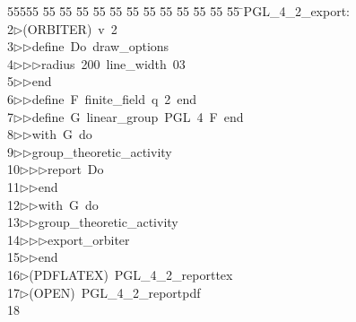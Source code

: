 %
%
\begin{tabbing}
55555 \= 55 \= 55 \= 55 \= 55 \= 55 \= 55 \= 55 \= 55 \= 55 \= 55 \= 55 \= 55 \= \>PGL\_4\_2\_export:\\[0pt]
2\>$\triangleright$\>(ORBITER)\ v\ 2\ \\[0pt]
3\>$\triangleright$\>$\triangleright$\>define\ Do\ draw\_options\ \\[0pt]
4\>$\triangleright$\>$\triangleright$\>$\triangleright$\>radius\ 200\ line\_width\ 03\ \\[0pt]
5\>$\triangleright$\>$\triangleright$\>end\ \\[0pt]
6\>$\triangleright$\>$\triangleright$\>define\ F\ finite\_field\ q\ 2\ end\ \\[0pt]
7\>$\triangleright$\>$\triangleright$\>define\ G\ linear\_group\ PGL\ 4\ F\ end\ \\[0pt]
8\>$\triangleright$\>$\triangleright$\>with\ G\ do\ \\[0pt]
9\>$\triangleright$\>$\triangleright$\>group\_theoretic\_activity\ \\[0pt]
10\>$\triangleright$\>$\triangleright$\>$\triangleright$\>report\ Do\ \\[0pt]
11\>$\triangleright$\>$\triangleright$\>end\ \\[0pt]
12\>$\triangleright$\>$\triangleright$\>with\ G\ do\ \\[0pt]
13\>$\triangleright$\>$\triangleright$\>group\_theoretic\_activity\ \\[0pt]
14\>$\triangleright$\>$\triangleright$\>$\triangleright$\>export\_orbiter\ \\[0pt]
15\>$\triangleright$\>$\triangleright$\>end\\[0pt]
16\>$\triangleright$\>(PDFLATEX)\ PGL\_4\_2\_reporttex\\[0pt]
17\>$\triangleright$\>(OPEN)\ PGL\_4\_2\_reportpdf\\[0pt]
18\>\end{tabbing}

